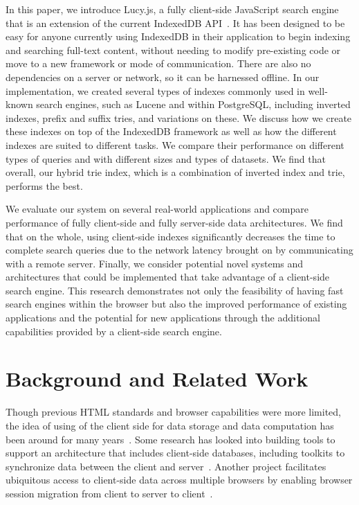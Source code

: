 \documentclass{vldb}
\begin{document}
In this paper, we introduce Lucy.js, a fully client-side JavaScript search engine that is an extension of the current IndexedDB API~\cite{indexeddb}. It has been designed to be easy for anyone currently using IndexedDB in their application to begin indexing and searching full-text content, without needing to modify pre-existing code or move to a new framework or mode of communication. There are also no dependencies on a server or network, so it can be harnessed offline. In our implementation, we created several types of indexes commonly used in well-known search engines, such as Lucene and within PostgreSQL, including inverted indexes, prefix and suffix tries, and variations on these. We discuss how we create these indexes on top of the IndexedDB framework as well as how the different indexes are suited to different tasks. We compare their performance on different types of queries and with different sizes and types of datasets. We find that overall, our hybrid trie index, which is a combination of inverted index and trie, performs the best.

We evaluate our system on several real-world applications and compare performance of fully client-side and fully server-side data architectures. We find that on the whole, using client-side indexes significantly decreases the time to complete search queries due to the network latency brought on by communicating with a remote server.
Finally, we consider potential novel systems and architectures that could be implemented that take advantage of a client-side search engine.
This research demonstrates not only the feasibility of having fast search engines within the browser but also the improved performance of existing applications and the potential for new applications through the additional capabilities provided by a client-side search engine.



\section{Background and Related Work}

Though previous HTML standards and browser capabilities were more limited, the idea of using of the client side for data storage and data computation has been around for many years~\cite{bharat2000searchpad}. 
Some research has looked into building tools to support an architecture that includes client-side databases, including toolkits to synchronize data between the client and server~\cite{benson2010sync}. Another project facilitates ubiquitous access to client-side data across multiple browsers by enabling browser session migration from client to server to client~\cite{lo2013imagen}. 
\end{document}
